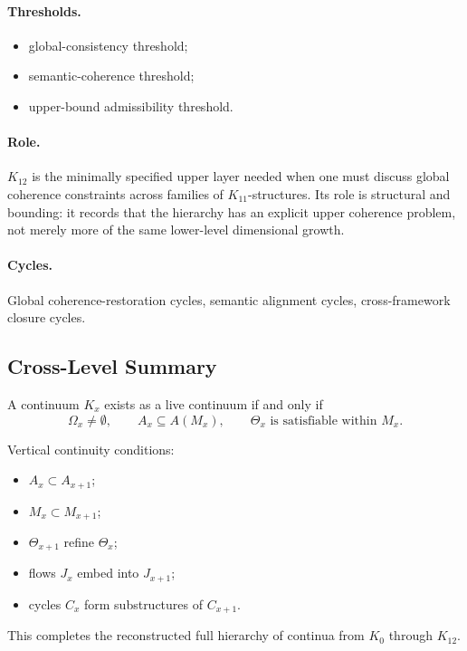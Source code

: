 \paragraph{Thresholds.}
\begin{itemize}
    \item global-consistency threshold;
    \item semantic-coherence threshold;
    \item upper-bound admissibility threshold.
\end{itemize}

\paragraph{Role.}
\(K_{12}\) is the minimally specified upper layer needed when one must discuss
global coherence constraints across families of \(K_{11}\)-structures.
Its role is structural and bounding: it records that the hierarchy has an
explicit upper coherence problem, not merely more of the same lower-level
dimensional growth.

\paragraph{Cycles.}
Global coherence-restoration cycles, semantic alignment cycles,
cross-framework closure cycles.


\subsection{Cross-Level Summary}

A continuum \(K_x\) exists as a live continuum if and only if
\[
   \Omega_x \neq \emptyset,
   \qquad
   A_x \subseteq A(M_x),
   \qquad
   \Theta_x \text{ is satisfiable within } M_x.
\]

Vertical continuity conditions:
\begin{itemize}
    \item \(A_x \subset A_{x+1}\);
    \item \(M_x \subset M_{x+1}\);
    \item \(\Theta_{x+1}\) refine \(\Theta_x\);
    \item flows \(J_x\) embed into \(J_{x+1}\);
    \item cycles \(C_x\) form substructures of \(C_{x+1}\).
\end{itemize}

This completes the reconstructed full hierarchy of continua from
\(K_0\) through \(K_{12}\).
